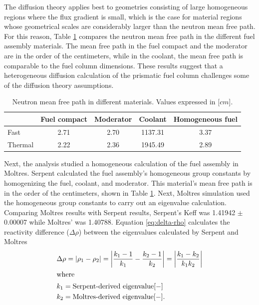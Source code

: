 The diffusion theory applies best to geometries consisting of large homogeneous regions where the flux gradient is small, which is the case for material regions whose geometrical scales are considerably larger than the neutron mean free path.
For this reason, Table \ref{tab:mfp} compares the neutron mean free path in the different fuel assembly materials.
The mean free path in the fuel compact and the moderator are in the order of the centimeters, while in the coolant, the mean free path is comparable to the fuel column dimensions.
These results suggest that a heterogeneous diffusion calculation of the prismatic fuel column challenges some of the diffusion theory assumptions.

\begin{table}[htbp!]
  \centering
  \caption{Neutron mean free path in different materials. Values expressed in [$cm$].}
  \begin{tabular}{lcccc}
  \toprule
              & Fuel compact  & Moderator  & Coolant  & Homogeneous fuel \\
  \midrule
  Fast  		  & 2.71 & 2.70 & 1137.31 & 3.37 \\
  Thermal		  & 2.22 & 2.36 & 1945.49 & 2.89 \\
  \bottomrule
  \end{tabular}
  \label{tab:mfp}
\end{table}

Next, the analysis studied a homogeneous calculation of the fuel assembly in Moltres.
Serpent calculated the fuel assembly's homogeneous group constants by homogenizing the fuel, coolant, and moderator.
This material's mean free path is in the order of the centimeters, shown in Table \ref{tab:mfp}.
Next, Moltres simulation used the homogeneous group constants to carry out an eigenvalue calculation.
Comparing Moltres results with Serpent results, Serpent's \gls{Keff} was 1.41942 $\pm$ 0.00007 while Moltres' was 1.40788.
Equation \ref{eq:delta-rho} calculates the reactivity difference ($\Delta \rho$) between the eigenvalues calculated by Serpent and Moltres
\begin{align}
  & \Delta \rho = \left| \rho_1 - \rho_2 \right| = \left| \frac{k_1-1}{k_1} - \frac{k_2-1}{k_2} \right| = \left| \frac{k_1-k_2}{k_1 k_2} \right| \label{eq:delta-rho} \\
  \intertext{where}
  & k_1 = \mbox{Serpent-derived eigenvalue} [-] \notag \\
  & k_2 = \mbox{Moltres-derived eigenvalue} [-]. \notag
\end{align}

